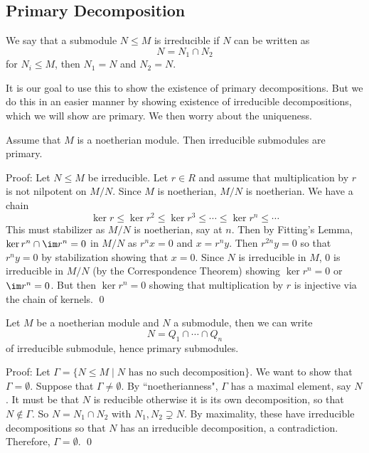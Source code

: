 \subsection{Primary Decomposition}

\begin{dfn}
We say that a submodule $N \leq M$ is irreducible if $N$ can be written as
\[
N=N_1 \cap N_2
\]
for $N_i \leq M$, then $N_1=N$ and $N_2=N$.
\end{dfn}

It is our goal to use this to show the existence of primary decompositions. But we do this in an easier manner by showing existence of irreducible decompositions, which we will show are primary. We then worry about the uniqueness. 

\begin{lem}
Assume that $M$ is a noetherian module. Then irreducible submodules are primary.
\end{lem}

\noindent Proof: Let $N \leq M$ be irreducible. Let $r \in R$ and assume that multiplication by $r$ is not nilpotent on $M/N$. Since $M$ is noetherian, $M/N$ is noetherian. We have a chain
\[
\ker r \leq \ker r^2 \leq \ker r^3 \leq \cdots \leq \ker r^n \leq \cdots
\]
This must stabilizer as $M/N$ is noetherian, say at $n$. Then by Fitting's Lemma, $\ker r^n \cap \im r^n=0$ in $M/N$ as $r^nx=0$ and $x=r^ny$. Then $r^{2n}y=0$ so that $r^ny=0$ by stabilization showing that $x=0$. Since $N$ is irreducible in $M$, 0 is irreducible in $M/N$ (by the Correspondence Theorem) showing $\ker r^n=0$ or $\im r^n=0$. But then $\ker r^n=0$ showing that multiplication by $r$ is injective via the chain of kernels. \qed \\

\begin{thmm}[Noether, 1921]
Let $M$ be a noetherian module and $N$ a submodule, then we can write
\[
N= Q_1 \cap \cdots \cap Q_n
\]
of irreducible submodule, hence primary submodules. 
\end{thmm}

\noindent Proof: Let $\Gamma=\{ N \leq M \;|\; N \text{ has no such decomposition}\}$. We want to show that $\Gamma=\emptyset$. Suppose that $\Gamma \neq \emptyset$. By ``noetherianness", $\Gamma$ has a maximal element, say $N$. It must be that $N$ is reducible otherwise it is its own decomposition, so that $N \notin \Gamma$. So $N=N_1 \cap N_2$ with $N_1,N_2 \supsetneq N$. By maximality, these have irreducible decompositions so that $N$ has an irreducible decomposition, a contradiction. Therefore, $\Gamma=\emptyset$. \qed \\

